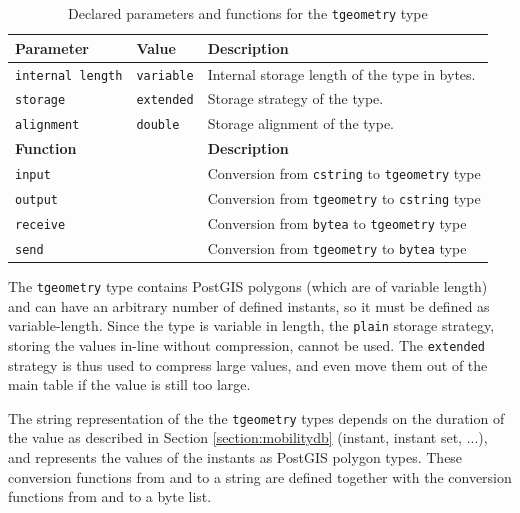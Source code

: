 \begin{table}[htb]
    \centering
    \begin{tabularx}{\textwidth}{|l|l|X|}
    \hline
    \textbf{Parameter}  & \textbf{Value}        & \textbf{Description} \\ 
    \hline
    \lstinline+internal length+     & \lstinline+variable+              & Internal storage length of the type in bytes. \\
    \hline
    \lstinline+storage+             & \lstinline+extended+              & Storage strategy of the type. \\
    \hline
    \lstinline+alignment+           & \lstinline+double+                & Storage alignment of the type. \\
    \hline
    \multicolumn{2}{|l|}{\textbf{Function}}     & \textbf{Description} \\ 
    \hline
    \multicolumn{2}{|l|}{\lstinline+input+}     & Conversion from \lstinline{cstring} to \lstinline{tgeometry} type \\
    \hline
    \multicolumn{2}{|l|}{\lstinline+output+}    & Conversion from \lstinline{tgeometry} to \lstinline{cstring} type \\
    \hline
    \multicolumn{2}{|l|}{\lstinline+receive+}   & Conversion from \lstinline{bytea} to \lstinline{tgeometry} type \\
    \hline
    \multicolumn{2}{|l|}{\lstinline+send+}      & Conversion from \lstinline{tgeometry} to \lstinline{bytea} type \\
    \hline
    \end{tabularx}
    \caption{Declared parameters and functions for the \lstinline{tgeometry} type}
    \label{table:tgeometry_type_declaration}
\end{table}

The \lstinline+tgeometry+ type contains PostGIS polygons (which are of variable length) and can have an arbitrary number of defined instants, so it must be defined as variable-length. Since the type is variable in length, the \lstinline{plain} storage strategy, storing the values in-line without compression, cannot be used. The \lstinline{extended} strategy is thus used to compress large values, and even move them out of the main table if the value is still too large.

The string representation of the the \lstinline+tgeometry+ types depends on the duration of the value as described in Section \ref{section:mobilitydb} (instant, instant set, ...), and represents the values of the instants as PostGIS polygon types. These conversion functions from and to a string are defined together with the conversion functions from and to a byte list.

